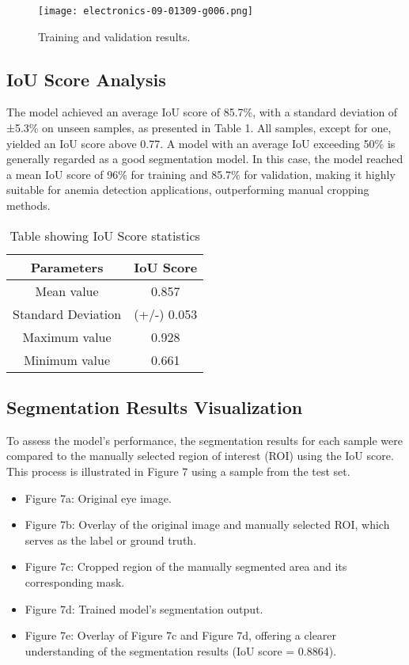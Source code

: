 \documentclass[conference]{IEEEtran}
\begin{document}
\begin{figure}[htbp]
\centerline{\texttt{[image: electronics-09-01309-g006.png]}}
\caption{Training and validation results.}
\label{fig}
\end{figure}

\subsection{\textbf{IoU Score Analysis}}
The model achieved an average IoU score of 85.7\%, with a standard deviation of ±5.3\% on unseen samples, as presented in Table 1. All samples, except for one, yielded an IoU score above 0.77. A model with an average IoU exceeding 50\% is generally regarded as a good segmentation model. In this case, the model reached a mean IoU score of 96\% for training and 85.7\% for validation, making it highly suitable for anemia detection applications, outperforming manual cropping methods.

\begin{table}[]
    \centering
    \begin{tabular}{|c|c|}
        \hline
        \textbf{Parameters} & \textbf{IoU Score} \\ \hline
        Mean value & 0.857 \\ \hline
        Standard Deviation & (+/-) 0.053 \\ \hline
        Maximum value & 0.928 \\ \hline
        Minimum value & 0.661 \\ \hline
    \end{tabular}
    \caption{Table showing IoU Score statistics}
    \label{tab:iou_score}
\end{table}


\subsection{\textbf{Segmentation Results Visualization}}
To assess the model's performance, the segmentation results for each sample were compared to the manually selected region of interest (ROI) using the IoU score. This process is illustrated in Figure 7 using a sample from the test set. 
\begin{itemize}
    \item Figure 7a: Original eye image.
    \item Figure 7b: Overlay of the original image and manually selected ROI, which serves as the label or ground truth.
    \item Figure 7c: Cropped region of the manually segmented area and its corresponding mask.
    \item Figure 7d: Trained model’s segmentation output.
    \item Figure 7e: Overlay of Figure 7c and Figure 7d, offering a clearer understanding of the segmentation results (IoU score = 0.8864).
\end{itemize}
\end{document}
